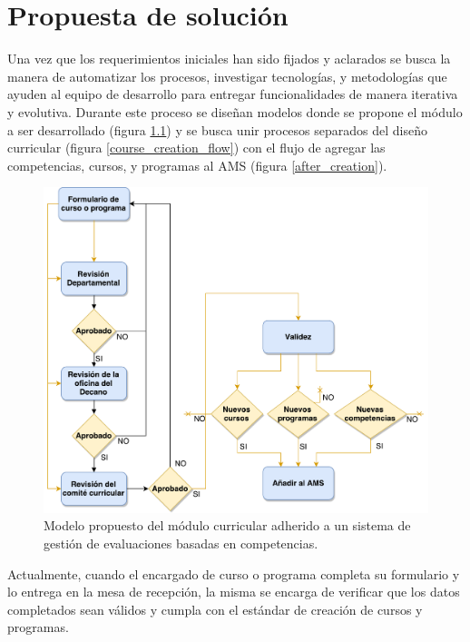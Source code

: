 \chapter{Propuesta de solución} %
\label{capitulo5} %
Una vez que los requerimientos iniciales han sido fijados y aclarados se busca la manera de automatizar los procesos, investigar tecnologías, y metodologías que ayuden al equipo de desarrollo para entregar funcionalidades de manera iterativa y evolutiva. Durante este proceso se diseñan modelos donde se propone el módulo a ser desarrollado (figura \ref{curriculum_model}) y se busca unir procesos separados del diseño curricular (figura \ref{course_creation_flow}) con el flujo de agregar las competencias, cursos, y programas al AMS (figura \ref{after_creation}).

\begin{figure}[H]
\centering
\includegraphics[scale=0.5]{Capitulos/PropuestadeSolucion/Imagenes/curriculum_model}
\caption{Modelo propuesto del módulo curricular adherido a un sistema de gestión de evaluaciones basadas en competencias.}
  \label{curriculum_model}
\end{figure}

Actualmente, cuando el encargado de curso o programa completa su formulario y lo entrega en la mesa de recepción, la misma se encarga de verificar que los datos completados sean válidos y cumpla con el estándar de creación de cursos y programas. 

